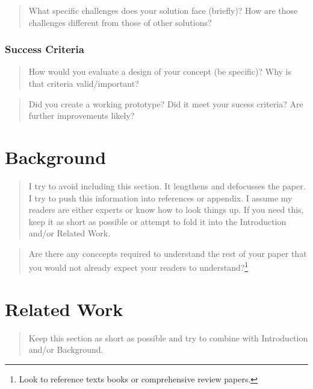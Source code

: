 \documentclass[
  10pt,
  draftcls,
  technote,
  letterpaper,
  oneside,
  onecolumn]{IEEEtran}
\begin{document}
\begin{quote}
What specific challenges does your solution face (briefly)? How are
those challenges different from those of other solutions?
\end{quote}

\hypertarget{success-criteria}{%
\subsubsection{Success Criteria}\label{success-criteria}}

\begin{quote}
How would you evaluate a design of your concept (be specific)? Why is
that criteria valid/important?
\end{quote}

\begin{quote}
Did you create a working prototype? Did it meet your sucess criteria?
Are further improvements likely?
\end{quote}

\hypertarget{background}{%
\section{Background}\label{background}}

\begin{quote}
I try to avoid including this section. It lengthens and defocusses the
paper. I try to push this information into references or appendix. I
assume my readers are either experts or know how to look things up. If
you need this, keep it as short as possible or attempt to fold it into
the Introduction and/or Related Work.
\end{quote}

\begin{quote}
Are there any conccepts required to understand the rest of your paper
that you would not already expect your readers to understand?\footnote{Look
  to reference texts books or comprehensive review papers.}
\end{quote}

\hypertarget{related-work}{%
\section{Related Work}\label{related-work}}

\begin{quote}
Keep this section as short as possible and try to combine with
Introduction and/or Background.
\end{quote}
\end{document}
